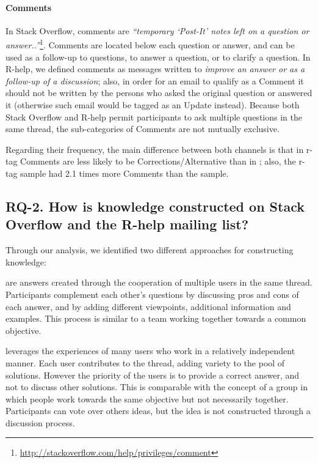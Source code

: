 \paragraph*{Comments}

In Stack Overflow, comments are \textit{``temporary `Post-It' notes left on a question or
  answer..''}\footnote{\url{http://stackoverflow.com/help/privileges/comment}}.  Comments are
located below each question or answer, and can be used as a follow-up to questions, to answer a
question, or to clarify a question.  In R-help, we defined comments as messages written to
\emph{improve an answer or as a follow-up of a discussion}; also, in order for an email to qualify
as a Comment it should not be written by the persons who asked the original question or answered it (otherwise such email would be tagged as an Update instead).
Because both Stack Overflow and R-help permit
participants to ask multiple questions in the same thread, the sub-categories of Comments
are not mutually exclusive.  

Regarding their frequency, the main difference between both channels is that in \SO r-tag Comments are less likely to
be Corrections/Alternative than in \RH; also, the \SO r-tag sample had 2.1 times more Comments than the \RH sample.

\subsection{RQ-2. How is knowledge constructed on Stack Overflow and the R-help mailing list?}
\label{sec:rq2}

    Through our analysis, we identified two different approaches for constructing knowledge:

\begin{description}[itemsep=2pt, topsep=0pt, leftmargin=1em, parsep=0pt]
\item[Participatory knowledge construction] are answers created through the cooperation of multiple
  users in the same thread.  Participants complement each other's questions by discussing pros and
  cons of each answer, and by adding different viewpoints, additional information and examples.
  This process is similar to a team working together towards
  a common objective.

\item[Crowd knowledge construction] leverages the experiences of many users who work in a relatively
  independent manner. Each user contributes to the thread, adding variety to the
  pool of solutions. However the priority of the users is to provide a correct answer, and not to discuss other solutions.
  This is comparable with the concept of a group in which people work towards the
  same objective but not necessarily together.  Participants can vote over others ideas, but the
  idea is not constructed through a discussion process.
\end{description}


